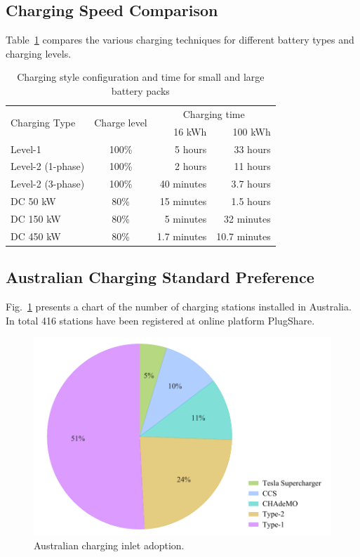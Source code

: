 \subsection{Charging Speed Comparison}
Table~\ref{tbl:10:techniques} compares the various charging techniques for different battery types and charging levels.
\begin{table}[H]
	\centering
	\caption{Charging style configuration and time for small and large battery packs}
	\label{tbl:10:techniques}
	\begin{tabular}{lcrr}
		\toprule
		\multirow{2}{*}{Charging Type} & \multirow{2}{*}{Charge level} & \multicolumn{2}{c}{Charging time} \\
		\cmidrule(l){3-4}              &                               &   16 kWh    &       100 kWh       \\ \midrule
		Level-1                        &             100\%             &   5 hours   &      33 hours       \\
		Level-2 (1-phase)              &             100\%             &   2 hours   &      11 hours       \\
		Level-2 (3-phase)              &             100\%             & 40 minutes  &      3.7 hours      \\
		DC   50 kW                      &             80\%              & 15 minutes  &      1.5 hours      \\
		DC 150 kW                       &             80\%              &  5 minutes  &     32 minutes      \\
		DC 450 kW                       &             80\%              & 1.7 minutes &    10.7 minutes     \\ \bottomrule
	\end{tabular}
\end{table}

\subsection{Australian Charging Standard Preference}
Fig.~\ref{fig:10:ausplug} presents a chart of the number of charging stations installed in Australia. In total 416 stations have been registered at online platform PlugShare.

\begin{figure}[H]
	\centering
	\includegraphics[width=0.7\linewidth]{ausplug}
	\caption{Australian charging inlet adoption.}
	\label{fig:10:ausplug}
\end{figure}

